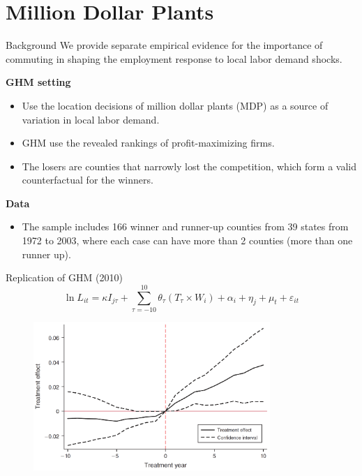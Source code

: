 \documentclass{beamer}
\begin{document}
\section{Million Dollar Plants}
\begin{frame}[shrink]
	\transfade %
	\tableofcontents[sectionstyle=show/shaded,subsectionstyle=show/shaded/hide]
	\addtocounter{framenumber}{-1}
\end{frame}
\begin{frame}{Background}
	We provide separate empirical evidence for the importance of commuting in shaping the employment response to local labor demand shocks.
	\medskip

	\textbf{GHM setting}
	\begin{itemize}
		\item Use the location decisions of million dollar plants (MDP) as a source of variation in local labor demand.
		\item GHM use the revealed rankings of profit-maximizing firms.
		\item The losers are counties that narrowly lost the competition, which form a valid counterfactual for the winners.
	\end{itemize}
	\medskip

	\textbf{Data}
	\begin{itemize}
		\item The sample includes 166 winner and runner-up counties from 39 states from 1972 to 2003, where each case can have more than 2 counties (more than one runner up).
	\end{itemize}
\end{frame}
\begin{frame}{Replication of GHM (2010)}
	\begin{equation}
		\ln L_{it} = \kappa I_{j\tau} + \sum_{\tau=-10}^{10}\theta_\tau (T_\tau\times W_i) + \alpha_i + \eta_j + \mu_t + \varepsilon_{it}
	\end{equation}
	\begin{figure}[htbp]
		\centering
		\includegraphics[width=0.8\textwidth]{fig4.png}
	\end{figure}
\end{frame}
\end{document}
